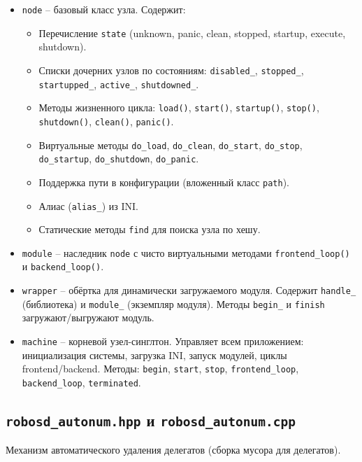 \documentclass[a4paper,12pt]{article}
\begin{document}
\begin{itemize}
    \item \texttt{node} -- базовый класс узла. Содержит:
        \begin{itemize}
            \item Перечисление \texttt{state} (unknown, panic, clean, stopped, startup, execute, shutdown).
            \item Списки дочерних узлов по состояниям: \texttt{disabled\_}, \texttt{stopped\_}, \texttt{startupped\_}, \texttt{active\_}, \texttt{shutdowned\_}.
            \item Методы жизненного цикла: \texttt{load()}, \texttt{start()}, \texttt{startup()}, \texttt{stop()}, \texttt{shutdown()}, \texttt{clean()}, \texttt{panic()}.
            \item Виртуальные методы \texttt{do\_load}, \texttt{do\_clean}, \texttt{do\_start}, \texttt{do\_stop}, \texttt{do\_startup}, \texttt{do\_shutdown}, \texttt{do\_panic}.
            \item Поддержка пути в конфигурации (вложенный класс \texttt{path}).
            \item Алиас (\texttt{alias\_}) из INI.
            \item Статические методы \texttt{find} для поиска узла по хешу.
        \end{itemize}
    \item \texttt{module} -- наследник \texttt{node} с чисто виртуальными методами \texttt{frontend\_loop()} и \texttt{backend\_loop()}.
    \item \texttt{wrapper} -- обёртка для динамически загружаемого модуля. Содержит \texttt{handle\_} (библиотека) и \texttt{module\_} (экземпляр модуля). Методы \texttt{begin\_} и \texttt{finish} загружают/выгружают модуль.
    \item \texttt{machine} -- корневой узел-синглтон. Управляет всем приложением: инициализация системы, загрузка INI, запуск модулей, циклы frontend/backend. Методы: \texttt{begin}, \texttt{start}, \texttt{stop}, \texttt{frontend\_loop}, \texttt{backend\_loop}, \texttt{terminated}.
\end{itemize}

\subsection{\texttt{robosd\_autonum.hpp} и \texttt{robosd\_autonum.cpp}}

Механизм автоматического удаления делегатов (сборка мусора для делегатов).
\end{document}
